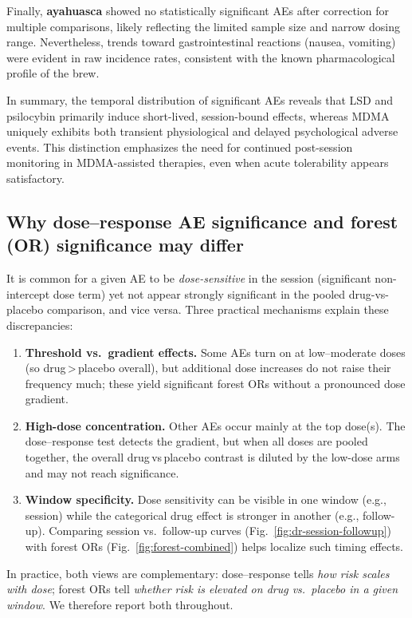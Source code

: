 Finally, \textbf{ayahuasca} showed no statistically significant AEs after correction for multiple comparisons, likely reflecting the limited sample size and narrow dosing range. Nevertheless, trends toward gastrointestinal reactions (nausea, vomiting) were evident in raw incidence rates, consistent with the known pharmacological profile of the brew.

In summary, the temporal distribution of significant AEs reveals that LSD and psilocybin primarily induce short-lived, session-bound effects, whereas MDMA uniquely exhibits both transient physiological and delayed psychological adverse events.  
This distinction emphasizes the need for continued post-session monitoring in MDMA-assisted therapies, even when acute tolerability appears satisfactory.


\subsection{Why dose–response AE significance and forest (OR) significance may differ}

It is common for a given AE to be \emph{dose-sensitive} in the session (significant non-intercept dose term) yet not appear strongly significant in the pooled drug-vs-placebo comparison, and vice versa. Three practical mechanisms explain these discrepancies:

\begin{enumerate}
  \item \textbf{Threshold vs.\ gradient effects.} Some AEs turn on at low–moderate doses (so drug\,>\,placebo overall), but additional dose increases do not raise their frequency much; these yield significant forest ORs without a pronounced dose gradient.
  \item \textbf{High-dose concentration.} Other AEs occur mainly at the top dose(s). The dose–response test detects the gradient, but when all doses are pooled together, the overall drug\,vs\,placebo contrast is diluted by the low-dose arms and may not reach significance.
  \item \textbf{Window specificity.} Dose sensitivity can be visible in one window (e.g., session) while the categorical drug effect is stronger in another (e.g., follow-up). Comparing session vs.\ follow-up curves (Fig.~\ref{fig:dr-session-followup}) with forest ORs (Fig.~\ref{fig:forest-combined}) helps localize such timing effects.
\end{enumerate}

In practice, both views are complementary: dose–response tells \emph{how risk scales with dose}; forest ORs tell \emph{whether risk is elevated on drug vs.\ placebo in a given window}. We therefore report both throughout.
